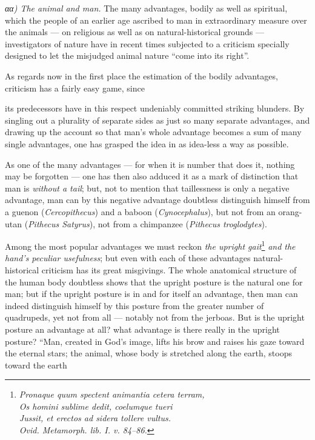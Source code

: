 \documentclass[12pt,a4paper]{book}
\begin{document}
\emph{αα) The animal and man.} The many advantages, bodily as well as spiritual, which
the people of an earlier age ascribed to man in extraordinary measure over the animals
--- on religious as well as on natural-historical grounds --- investigators of nature
have in recent times subjected to a criticism specially designed to let the misjudged
animal nature ``come into its right''.

As regards now in the first place the estimation of the bodily advantages, criticism has
a fairly easy game, since

\setcounter{footnote}{0}
its predecessors have in this respect undeniably committed striking blunders. By
singling out a plurality of separate sides as just so many separate advantages, and
drawing up the account so that man's whole advantage becomes a sum of many single
advantages, one has grasped the idea in as idea-less a way as possible.

As one of the many advantages --- for when it is number that does it, nothing may be
forgotten --- one has then also adduced it as a mark of distinction that man is
\emph{without a tail}; but, not to mention that taillessness is only a negative
advantage, man can by this negative advantage doubtless distinguish himself from a
guenon (\textit{Cercopithecus}) and a baboon (\textit{Cynocephalus}), but not from an
orang-utan (\textit{Pithecus Satyrus}), not from a chimpanzee
(\textit{Pithecus troglodytes}).

Among the most popular advantages we must reckon \emph{the upright
gait}\footnote{\textit{Pronaque quum spectent animantia cetera terram,\\
Os homini sublime dedit, coelumque tueri\\
Jussit, et erectos ad sidera tollere vultus.\\
Ovid. Metamorph. lib. I. v. 84--86.}}
\emph{and the hand's peculiar usefulness}; but even with each of these advantages
natural-historical criticism has its great misgivings. The whole anatomical structure
of the human body doubtless shows that the upright posture is the natural one for man;
but if the upright posture is in and for itself an advantage, then man can indeed
distinguish himself by this posture from the greater number of quadrupeds, yet not
from all --- notably not from the jerboas. But is the upright posture an advantage at
all? what advantage is there really in the upright posture? ``Man, created in God's
image, lifts his brow and raises his gaze toward the eternal stars; the animal, whose
body is stretched along the earth, stoops toward the earth
\end{document}
